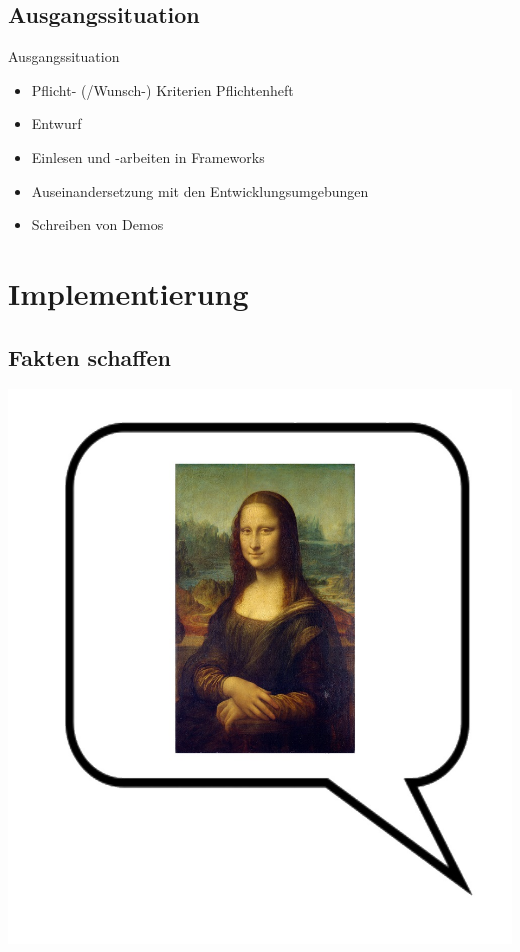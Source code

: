 \documentclass[19pt]{beamer}
\begin{document}
\subsection{Ausgangssituation}
\begin{frame}{Ausgangssituation}
	\begin{itemize}
		\item Pflicht- (/Wunsch-) Kriterien Pflichtenheft
		\pause
		\item Entwurf
		\pause
		\item Einlesen und -arbeiten in Frameworks
		\pause
		\item Auseinandersetzung mit den Entwicklungsumgebungen
		\pause
		\item Schreiben von Demos
	\end{itemize}
\end{frame}

\section{Implementierung}

\subsection{Fakten schaffen}
\begin{frame}
\begin{center}
\includegraphics[scale=0.2]{resources/start2.jpg}
\end{center}
\end{frame}
\end{document}
